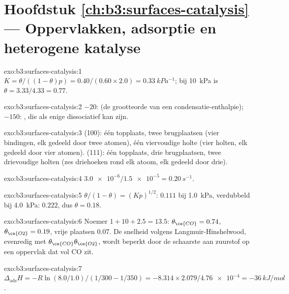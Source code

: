 \section*{Hoofdstuk \ref{ch:b3:surfaces-catalysis} --- Oppervlakken, adsorptie en heterogene katalyse}

\begin{solution}{exo:b3:surfaces-catalysis:1}
$K = \theta/((1 - \theta)p) = 0.40/(0.60 \times 2.0) = \qty{0.33}{kPa^{-1}}$; bij \qty{10}{kPa} is $\theta = 3.33/4.33 = 0.77$.
\end{solution}

\begin{solution}{exo:b3:surfaces-catalysis:2}
$-20$:  (de grootteorde van een condensatie-enthalpie); $-150$:
, die als enige dissociatief kan zijn.
\end{solution}

\begin{solution}{exo:b3:surfaces-catalysis:3}
(100): één topplaats, twee brugplaatsen (vier bindingen, elk gedeeld door
twee atomen), één viervoudige holte (vier holten, elk gedeeld door vier
atomen). (111): één topplaats, drie brugplaatsen, twee drievoudige holten
(zes driehoeken rond elk atoom, elk gedeeld door drie).
\end{solution}

\begin{solution}{exo:b3:surfaces-catalysis:4}
$\num{3.0e-6}/\num{1.5e-5} = \qty{0.20}{s^{-1}}$.
\end{solution}

\begin{solution}{exo:b3:surfaces-catalysis:5}
$\theta/(1 - \theta) = (Kp)^{1/2}$: $0.111$ bij \qty{1.0}{kPa}, verdubbeld bij \qty{4.0}{kPa}: $0.222$, dus $\theta = 0.18$.
\end{solution}

\begin{solution}{exo:b3:surfaces-catalysis:6}
Noemer $1 + 10 + 2.5 = 13.5$: $\theta_{\ce{CO}} = 0.74$, $\theta_{\ce{O2}} = 0.19$, vrije plaatsen 0.07. De
snelheid volgens Langmuir-Hinshelwood, evenredig met $\theta_{\ce{CO}}\theta_{\ce{O2}}$, wordt beperkt door de
schaarste aan zuurstof op een oppervlak dat vol CO zit.
\end{solution}

\begin{solution}{exo:b3:surfaces-catalysis:7}
$\Delta_{\mathrm{ads}}H = -R\ln(8.0/1.0)/(1/300 - 1/350) = -8.314 \times 2.079/\num{4.76e-4} = \qty{-36}{kJ/mol}$.
\end{solution}

